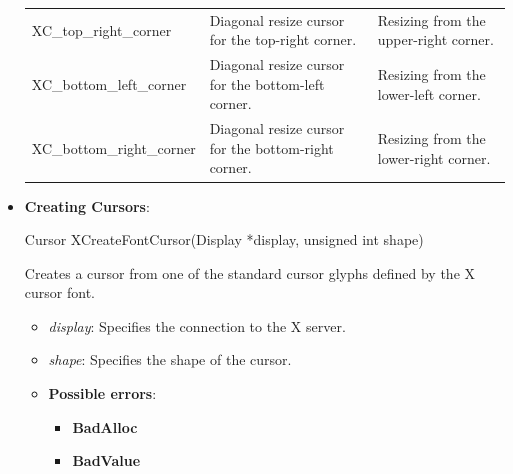 \documentclass{report}
\begin{document}
\begin{itemize}
\begin{center}
\begin{tabularx}{\textwidth}{@{}lXX@{}}
                    XC\_top\_right\_corner&	Diagonal resize cursor for the top-right corner.	&Resizing from the upper-right corner.\\[2ex]
                    XC\_bottom\_left\_corner&	Diagonal resize cursor for the bottom-left corner.	&Resizing from the lower-left corner.\\[2ex]
                    XC\_bottom\_right\_corner&	Diagonal resize cursor for the bottom-right corner.	&Resizing from the lower-right corner. \\
                    \bottomrule
                \end{tabularx}
            \end{center}
        \item \textbf{Creating Cursors}:
            \bigbreak \noindent 
            \begin{cppcode}
                Cursor XCreateFontCursor(Display *display, unsigned int shape)
            \end{cppcode}
            \bigbreak \noindent
            Creates a cursor from one of the standard cursor glyphs defined by the X cursor font.
            \begin{itemize}
                \item \textit{display}: Specifies the connection to the X server.
                \item \textit{shape}: Specifies the shape of the cursor.
            \end{itemize}
            \begin{itemize}
                \item \textbf{Possible errors}:
                    \begin{itemize}
                        \item \textbf{BadAlloc}
                        \item \textbf{BadValue}
                    \end{itemize}
            \end{itemize}




    \end{itemize}
\end{document}
